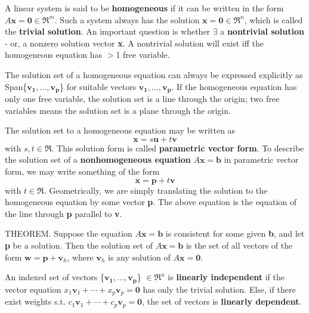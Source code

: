 \documentclass{article}
\begin{document}
\hfill \newline A linear system is said to be \textbf{homogeneous} if it can be written in the form $A\textbf{x} = \textbf{0} \in \Re^m$. Such a system always has the solution $\textbf{x} = \textbf{0} \in \Re^n$, which is called the \textbf{trivial solution}. An important question is whether $\exists$ a \textbf{nontrivial solution} - or, a nonzero solution vector \textbf{x}. A nontrivial solution will exist iff the homogeneous equation has $>$1 free variable.

\hfill \newline The solution set of a homogeneous equation can always be expressed explicitly as Span\{$\mathbf{v_1},\dots,\mathbf{v_p}$\} for suitable vectors $\mathbf{v_1},\dots,\mathbf{v_p}$. If the homogeneous equation has only one free variable, the solution set is a line through the origin; two free variables means the solution set is a plane through the origin. 

\hfill \newline The solution set to a homogeneous equation may be written as
\begin{equation}
    \textbf{x} = s\textbf{u} + t\textbf{v}
\end{equation}
with $s,t \in \Re$. This solution form is called \textbf{parametric vector form}. To describe the solution set of a \textbf{nonhomogeneous equation} $A\textbf{x}=\textbf{b}$ in parametric vector form, we may write something of the form 
\begin{equation}
    \textbf{x} = \textbf{p} + t\textbf{v}
\end{equation}
with $t \in \Re$. Geometrically, we are simply translating the solution to the homogeneous equation by some vector \textbf{p}. The above equation is the equation of the line through \textbf{p} parallel to \textbf{v}.

\hfill \newline THEOREM. Suppose the equation $A\textbf{x}=\textbf{b}$ is consistent for some given \textbf{b}, and let \textbf{p} be a solution. Then the solution set of $A\textbf{x}=\textbf{b}$ is the set of all vectors of the form $\textbf{w}=\textbf{p}+\textbf{v}_h$, where $\textbf{v}_h$ is any solution of $A\textbf{x}=\textbf{0}$.

\hfill \newline  An indexed set of vectors \{$\mathbf{v_1},\dots,\mathbf{v_p}$\} $\in \Re^n$ is \textbf{linearly independent} if the vector equation $x_1\textbf{v}_1 + \cdots + x_p\textbf{v}_p = \textbf{0}$ has only the trivial solution. Else, if there exist weights s.t. $c_1\textbf{v}_1 + \cdots + c_p\textbf{v}_p = \textbf{0}$, the set of vectors is \textbf{linearly dependent}. 
\end{document}
